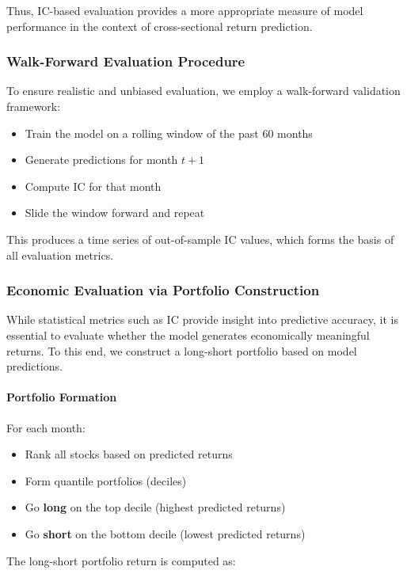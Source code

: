 \documentclass[11pt]{article}
\begin{document}
Thus, IC-based evaluation provides a more appropriate measure of model performance in the context of cross-sectional return prediction.

\subsubsection{Walk-Forward Evaluation Procedure}

To ensure realistic and unbiased evaluation, we employ a walk-forward validation framework:

\begin{itemize}
    \item Train the model on a rolling window of the past 60 months
    \item Generate predictions for month $t+1$
    \item Compute IC for that month
    \item Slide the window forward and repeat
\end{itemize}

This produces a time series of out-of-sample IC values, which forms the basis of all evaluation metrics.

\subsubsection{Economic Evaluation via Portfolio Construction}

While statistical metrics such as IC provide insight into predictive accuracy, it is essential to evaluate whether the model generates economically meaningful returns. To this end, we construct a long-short portfolio based on model predictions.

\paragraph{Portfolio Formation}

For each month:
\begin{itemize}
    \item Rank all stocks based on predicted returns
    \item Form quantile portfolios (deciles)
    \item Go \textbf{long} on the top decile (highest predicted returns)
    \item Go \textbf{short} on the bottom decile (lowest predicted returns)
\end{itemize}

The long-short portfolio return is computed as:
\end{document}
